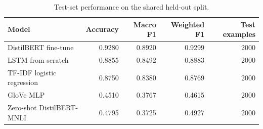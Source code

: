 \begin{table}
\caption{Test-set performance on the shared held-out split.}
\label{tab:test-results-generated}
\begin{tabular}{lrrrr}
\toprule
Model & Accuracy & Macro F1 & Weighted F1 & Test examples \\
\midrule
DistilBERT fine-tune & 0.9280 & 0.8920 & 0.9299 & 2000 \\
LSTM from scratch & 0.8855 & 0.8492 & 0.8883 & 2000 \\
TF-IDF logistic regression & 0.8750 & 0.8380 & 0.8769 & 2000 \\
GloVe MLP & 0.4510 & 0.3767 & 0.4615 & 2000 \\
Zero-shot DistilBERT-MNLI & 0.4795 & 0.3725 & 0.4927 & 2000 \\
\bottomrule
\end{tabular}
\end{table}
